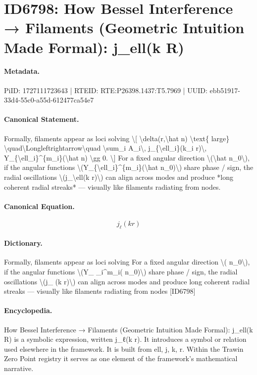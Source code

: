 \section*{ID6798: How Bessel Interference → Filaments (Geometric Intuition Made Formal): j\_ell(k R)}
\paragraph{Metadata.}
PiID: 1727111723643 | RTEID: RTE:P26398.1437:T5.7969 | UUID: ebb51917-33d4-55c0-a55d-612477ca54e7

\paragraph{Canonical Statement.}
Formally, filaments appear as loci solving \textbackslash{}[ \textbackslash{}delta(r,\textbackslash{}hat n) \textbackslash{}text\{ large\} \textbackslash{}quad\textbackslash{}Longleftrightarrow\textbackslash{}quad \textbackslash{}sum\_i A\_i\textbackslash{}, j\_\{\textbackslash{}ell\_i\}(k\_i r)\textbackslash{}, Y\_\{\textbackslash{}ell\_i\}\textasciicircum{}\{m\_i\}(\textbackslash{}hat n) \textbackslash{}gg 0. \textbackslash{}] For a fixed angular direction \textbackslash{}(\textbackslash{}hat n\_0\textbackslash{}), if the angular functions \textbackslash{}(Y\_\{\textbackslash{}ell\_i\}\textasciicircum{}\{m\_i\}(\textbackslash{}hat n\_0)\textbackslash{}) share phase / sign, the radial oscillations \textbackslash{}(j\_\textbackslash{}ell(k r)\textbackslash{}) can align across modes and produce *long coherent radial streaks* — visually like filaments radiating from nodes.

\paragraph{Canonical Equation.}
\[
j_\ell(k r)
\]

\paragraph{Dictionary.}
Formally, filaments appear as loci solving For a fixed angular direction \textbackslash{}( n\_0\textbackslash{}), if the angular functions \textbackslash{}(Y\_ \_i\textasciicircum{}m\_i( n\_0)\textbackslash{}) share phase / sign, the radial oscillations \textbackslash{}(j\_ (k r)\textbackslash{}) can align across modes and produce long coherent radial streaks — visually like filaments radiating from nodes [ID6798]

\paragraph{Encyclopedia.}
How Bessel Interference → Filaments (Geometric Intuition Made Formal): j\_ell(k R) is a symbolic expression, written j\_ℓ(k r). It introduces a symbol or relation used elsewhere in the framework. It is built from ell, j, k, r. Within the Trawin Zero Point registry it serves as one element of the framework's mathematical narrative.
